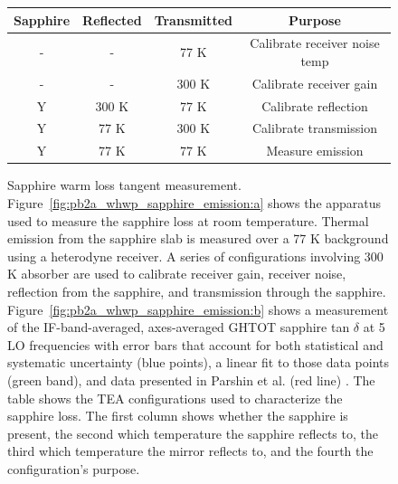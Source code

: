 \begin{figure}[!t]
    \centering
    \vspace{0.2cm}
    \centering
	\begin{tabu}{| c | c | c | c |}
	\hline
	Sapphire & Reflected & Transmitted & Purpose \\
	\hline
	\hline
	- & - & 77 K & Calibrate receiver noise temp \\
	\hline
	- & - & 300 K & Calibrate receiver gain \\	
	\hline
	Y & 300 K & 77 K & Calibrate reflection \\	
	\hline
	Y & 77 K & 300 K & Calibrate transmission \\ 
	\hline
	Y & 77 K & 77 K & Measure emission \\
	\hline
	\end{tabu}
    \caption[Sapphire warm loss tangent measurement]{Sapphire warm loss tangent measurement. Figure~\ref{fig:pb2a_whwp_sapphire_emission:a} shows the apparatus used to measure the sapphire loss at room temperature. Thermal emission from the sapphire slab is measured over a 77 K background using a heterodyne receiver. A series of configurations involving 300 K absorber are used to calibrate receiver gain, receiver noise, reflection from the sapphire, and transmission through the sapphire. Figure~\ref{fig:pb2a_whwp_sapphire_emission:b} shows a measurement of the IF-band-averaged, axes-averaged GHTOT sapphire tan $\delta$ at 5 LO frequencies with error bars that account for both statistical and systematic uncertainty (blue points), a linear fit to those data points (green band), and data presented in Parshin et al. (red line) \cite{parshin_silicon_1995}. The table shows the TEA configurations used to characterize the sapphire loss. The first column shows whether the sapphire is present, the second which temperature the sapphire reflects to, the third which temperature the mirror reflects to, and the fourth the configuration's purpose. \label{fig:pb2a_whwp_sapphire_emission}}

\end{figure}

